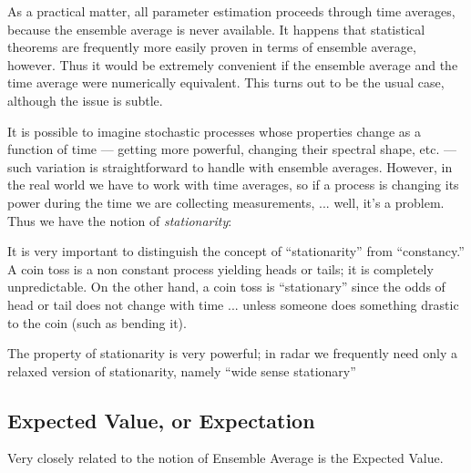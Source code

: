 As a practical matter, all parameter estimation proceeds through time
averages, because the ensemble average is never available.  It happens 
that statistical theorems are frequently more easily proven in terms
of ensemble average, however.  Thus it would be extremely convenient if
the ensemble average and the time average were numerically equivalent.
This turns out to be the usual case, although the issue is subtle.


It is possible to imagine stochastic processes whose properties change
as a function of time --- getting more powerful, changing their spectral
shape, etc. --- such variation is straightforward to handle with
ensemble averages.  However, in the real world we have to work with
time averages, so if a process is changing its power during the time
we are collecting measurements, ... well, it's a problem.  Thus we
have the notion of \textit{stationarity}:



It is very important to distinguish the concept of ``stationarity''
from ``constancy.''  A coin toss is a non constant process yielding
heads or tails; it is completely unpredictable.  On the other hand, a
coin toss is ``stationary'' since the odds of head or tail does not
change with time ... unless someone does something drastic to the coin 
(such as bending it).

The property of stationarity is very powerful; in radar we frequently
need only a relaxed version of stationarity, namely ``wide sense
stationary''




\subsection{Expected Value, or Expectation} 

\label{s:expectedvalue}
Very closely related to the notion of Ensemble Average is the Expected
Value. 

